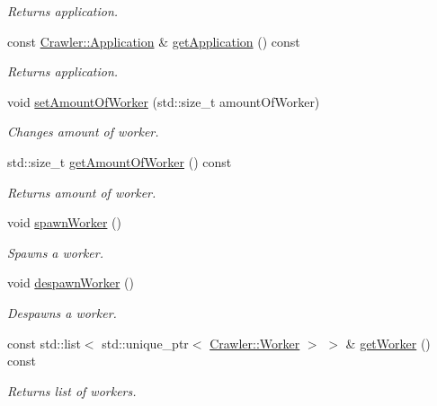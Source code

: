 \begin{DoxyCompactItemize}
\begin{DoxyCompactList}\small\item\em Returns application. \end{DoxyCompactList}\item 
const \hyperlink{class_crawler_1_1_application}{Crawler\+::\+Application} \& \hyperlink{class_crawler_1_1_worker_manager_a904127a9afd47ac7409a87c5cddbf404}{get\+Application} () const 
\begin{DoxyCompactList}\small\item\em Returns application. \end{DoxyCompactList}\item 
void \hyperlink{class_crawler_1_1_worker_manager_abb08a70465a495d7f7bef9388c73e6c7}{set\+Amount\+Of\+Worker} (std\+::size\+\_\+t amount\+Of\+Worker)
\begin{DoxyCompactList}\small\item\em Changes amount of worker. \end{DoxyCompactList}\item 
std\+::size\+\_\+t \hyperlink{class_crawler_1_1_worker_manager_a90edb07566d306b3e40625a109926478}{get\+Amount\+Of\+Worker} () const 
\begin{DoxyCompactList}\small\item\em Returns amount of worker. \end{DoxyCompactList}\item 
void \hyperlink{class_crawler_1_1_worker_manager_acf0f7d2269d469fdd10f90de1802a0e0}{spawn\+Worker} ()
\begin{DoxyCompactList}\small\item\em Spawns a worker. \end{DoxyCompactList}\item 
void \hyperlink{class_crawler_1_1_worker_manager_af77314b7fef1073a5a49e903fe9735ad}{despawn\+Worker} ()
\begin{DoxyCompactList}\small\item\em Despawns a worker. \end{DoxyCompactList}\item 
const std\+::list$<$ std\+::unique\+\_\+ptr$<$ \hyperlink{class_crawler_1_1_worker}{Crawler\+::\+Worker} $>$ $>$ \& \hyperlink{class_crawler_1_1_worker_manager_adc739a8db9184618bce1af698cad7351}{get\+Worker} () const 
\begin{DoxyCompactList}\small\item\em Returns list of workers. \end{DoxyCompactList}\item 

\end{DoxyCompactItemize}
